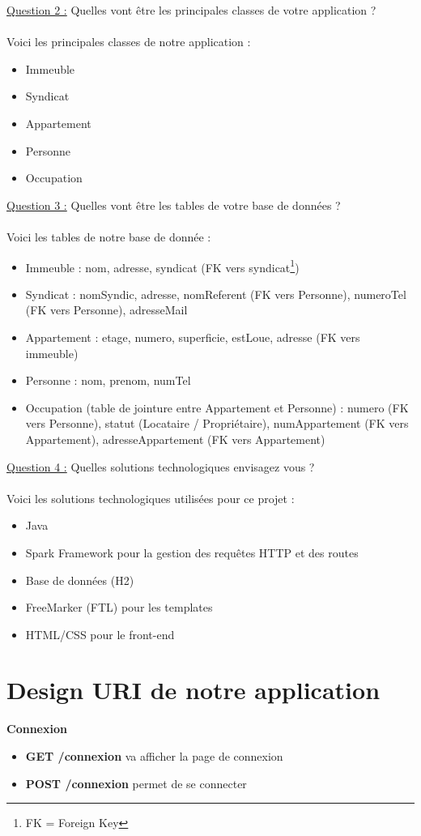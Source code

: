 \documentclass[french]{article}
\begin{document}
\underline{Question 2 :} Quelles vont être les principales classes de votre application ? \\ \\
Voici les principales classes de notre application :
\begin{itemize}
\item Immeuble
\item Syndicat
\item Appartement
\item Personne
\item Occupation \\
\end{itemize}

\underline{Question 3 :} Quelles vont être les tables de votre base de données ? \\ \\
Voici les tables de notre base de donnée :
\begin{itemize}
\item Immeuble : nom, adresse, syndicat (FK vers syndicat\footnote{FK = Foreign Key})
\item Syndicat : nomSyndic, adresse, nomReferent (FK vers Personne), numeroTel (FK vers Personne), adresseMail
\item Appartement : etage, numero, superficie, estLoue, adresse (FK vers immeuble)
\item Personne : nom, prenom, numTel
\item Occupation (table de jointure entre Appartement et Personne) : numero (FK vers Personne), statut (Locataire / Propriétaire), numAppartement (FK vers Appartement), adresseAppartement (FK vers Appartement) \\
\end{itemize}

\underline{Question 4 :} Quelles solutions technologiques envisagez vous ? \\ \\
Voici les solutions technologiques utilisées pour ce projet :
\begin{itemize}
\item Java
\item Spark Framework pour la gestion des requêtes HTTP et des routes
\item Base de données (H2)
\item FreeMarker (FTL) pour les templates 
\item HTML/CSS pour le front-end
\end{itemize}

\section{Design URI de notre application}
\noindent \textbf{Connexion}
\begin{itemize}
\item \textbf{GET /connexion} va afficher la page de connexion
\item \textbf{POST /connexion} permet de se connecter \\
\end{itemize}
\end{document}
